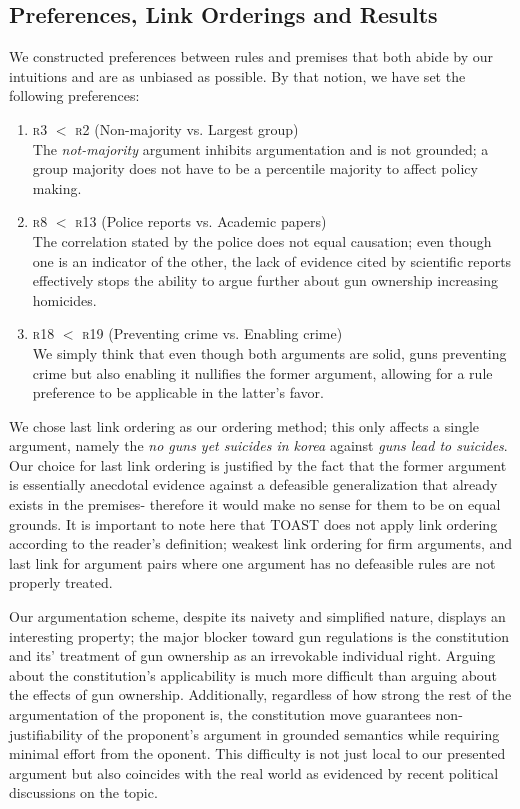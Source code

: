 \documentclass[]{article}
\begin{document}
\subsection{Preferences, Link Orderings and Results}
We constructed preferences between rules and premises that both abide by our intuitions and are as unbiased as possible. By that notion, we have set the following preferences:
\begin{enumerate}
\item \textsc{r3} $<$ \textsc{r2} (Non-majority vs. Largest group)\\
The \textit{not-majority} argument inhibits argumentation and is not grounded; a group majority does not have to be a percentile majority to affect policy making.
\item \textsc{r8} $<$ \textsc{r13} (Police reports vs. Academic papers)\\
The correlation stated by the police does not equal causation; even though one is an indicator of the other, the lack of evidence cited by scientific reports effectively stops the ability to argue further about gun ownership increasing homicides.
\item \textsc{r18} $<$ \textsc{r19} (Preventing crime vs. Enabling crime)\\
We simply think that even though both arguments are solid, guns preventing crime but also enabling it nullifies the former argument, allowing for a rule preference to be applicable in the latter's favor.
\end{enumerate}

We chose last link ordering as our ordering method; this only affects a single argument, namely the \textit{no guns yet suicides in korea} against \textit{guns lead to suicides}. Our choice for last link ordering is justified by the fact that the former argument is essentially anecdotal evidence against a defeasible generalization that already exists in the premises- therefore it would make no sense for them to be on equal grounds. It is important to note here that TOAST does not apply link ordering according to the reader's definition; weakest link ordering for firm arguments, and last link for argument pairs where one argument has no defeasible rules are not properly treated. 

Our argumentation scheme, despite its naivety and simplified nature, displays an interesting property; the major blocker toward gun regulations is the constitution and its' treatment of gun ownership as an irrevokable individual right. Arguing about the constitution's applicability is much more difficult than arguing about the effects of gun ownership. Additionally, regardless of how strong the rest of the argumentation of the proponent is, the constitution move guarantees non-justifiability of the proponent's argument in grounded semantics while requiring minimal effort from the oponent. This difficulty is not just local to our presented argument but also coincides with the real world as evidenced by recent political discussions on the topic.
\end{document}
